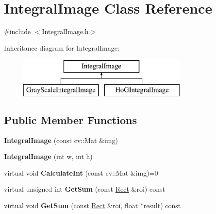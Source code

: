 \hypertarget{classIntegralImage}{}\section{Integral\+Image Class Reference}
\label{classIntegralImage}


{\ttfamily \#include $<$Integral\+Image.\+h$>$}

Inheritance diagram for Integral\+Image\+:\begin{figure}[H]
\begin{center}
\leavevmode
\includegraphics[height=2.000000cm]{classIntegralImage}
\end{center}
\end{figure}
\subsection*{Public Member Functions}
\begin{DoxyCompactItemize}
\item 
\hypertarget{classIntegralImage_a3cfe7e68c1e757de16b10c6a8d04bb0d}{}{\bfseries Integral\+Image} (const cv\+::\+Mat \&img)\label{classIntegralImage_a3cfe7e68c1e757de16b10c6a8d04bb0d}

\item 
\hypertarget{classIntegralImage_aee12d9b9aefddb1ea18c4bd0fa6dcbcc}{}{\bfseries Integral\+Image} (int w, int h)\label{classIntegralImage_aee12d9b9aefddb1ea18c4bd0fa6dcbcc}

\item 
\hypertarget{classIntegralImage_ae578410b9fca079c2274cfe1b0e45a12}{}virtual void {\bfseries Calculate\+Int} (const cv\+::\+Mat \&img)=0\label{classIntegralImage_ae578410b9fca079c2274cfe1b0e45a12}

\item 
\hypertarget{classIntegralImage_a8e9c76dadb4a74863991f3ca32c4e33d}{}virtual unsigned int {\bfseries Get\+Sum} (const \hyperlink{classRect}{Rect} \&roi) const \label{classIntegralImage_a8e9c76dadb4a74863991f3ca32c4e33d}

\item 
\hypertarget{classIntegralImage_a339adc6f566e0c66dd2e0fca979e5308}{}virtual void {\bfseries Get\+Sum} (const \hyperlink{classRect}{Rect} \&roi, float $\ast$result) const \label{classIntegralImage_a339adc6f566e0c66dd2e0fca979e5308}

\end{DoxyCompactItemize}

